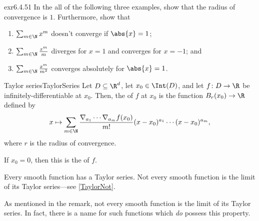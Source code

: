 \begin{exr}{}{exr6.4.51}
In the all of the following three examples, show that the radius of convergence is $1$.  Furthermore, show that
\begin{enumerate}
\item $\sum _{m\in \N}x^m$ doesn't converge if $\abs{x}=1$;
\item $\sum _{m\in \N}\frac{x^m}{m}$ diverges for $x=1$ and converges for $x=-1$; and
\item $\sum _{m\in \N}\frac{x^m}{m^2}$ converges absolutely for $\abs{x}=1$.
\end{enumerate}
\end{exr}
\begin{dfn}{Taylor series}{TaylorSeries}
Let $D\subseteq \R ^d$, let $x_0\in \Int (D)$, and let $f\colon D\rightarrow \R$ be infinitely-differentiable at $x_0$.  Then, the  of $f$ at $x_0$ is the function $B_r(x_0)\rightarrow \R$ defined by
\begin{equation}\label{Taylor}
x\mapsto \sum _{m\in \N}\frac{\nabla _{a_1}\cdots \nabla _{a_m}f(x_0)}{m!}(x-x_0)^{a_1}\cdots (x-x_0)^{a_m},
\end{equation}
where $r$ is the radius of convergence.
\begin{rmk}
If $x_0=0$, then this is the  of $f$.
\end{rmk}
\begin{rmk}
Every smooth function has a Taylor series.  Not every smooth function is the limit of its Taylor series---see \cref{TaylorNot}.
\end{rmk}
\end{dfn}
As mentioned in the remark, not every smooth function is the limit of its Taylor series.  In fact, there is a name for such functions which \emph{do} possess this property.
